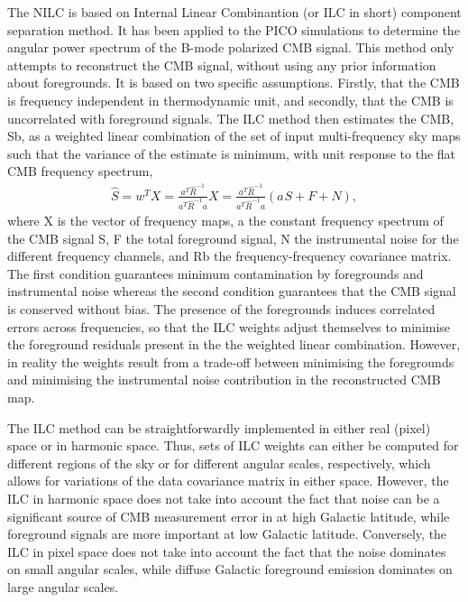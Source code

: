\documentclass[PICOReport.tex]{subfiles}
\begin{document}
The NILC is based on Internal Linear Combinantion (or ILC in short) component separation method. It has been applied to the PICO simulations to determine the angular power spectrum of the B-mode polarized CMB signal. This method only attempts to reconstruct the CMB signal, without using any prior information about foregrounds. It is based on two specific assumptions. Firstly, that the CMB is frequency independent in thermodynamic unit, and secondly, that the CMB is uncorrelated with foreground signals. The ILC method then estimates the CMB, Sb, as a weighted linear combination of the set of input multi-frequency sky maps such that the variance of the estimate is minimum, with unit response to the flat CMB frequency spectrum,
\begin{eqnarray} 
\widehat S = w^{T} X = \frac{\displaystyle{a^{T} \widehat R^{-1}}}{\displaystyle{a^{T} \widehat R^{-1} a}} X =\frac{\displaystyle{a^{T} \widehat R^{-1}}}{\displaystyle{a^{T} \widehat R^{-1} a}} \left(a^{ } S + F + N\right),
\label{equ:ilc} 
\end{eqnarray}
where X is the vector of frequency maps, a the constant frequency spectrum of the CMB signal S, F the total foreground signal, N the instrumental noise for the different frequency channels, and Rb the frequency-frequency covariance matrix. The first condition guarantees minimum contamination by foregrounds and instrumental noise whereas the second condition
guarantees that the CMB signal is conserved without bias. The presence of the foregrounds induces correlated errors across frequencies, so that the ILC weights adjust themselves to minimise the foreground residuals present in the the weighted linear combination. However, in reality the weights result from a trade-off between minimising the foregrounds and minimising
the instrumental noise contribution in the reconstructed CMB map.

The ILC method can be straightforwardly implemented in either real
(pixel) space or in harmonic space. Thus, sets of ILC weights can
either be computed for different regions of the sky or for different
angular scales, respectively, which allows for variations of the data
covariance matrix in either space.  However, the ILC in harmonic space
does not take into account the fact that noise can be a significant
source of CMB measurement error in at high Galactic latitude, while
foreground signals are more important at low Galactic
latitude. Conversely, the ILC in pixel space does not take into
account the fact that the noise dominates on small angular scales,
while diffuse Galactic foreground emission dominates on large angular
scales.
\end{document}
